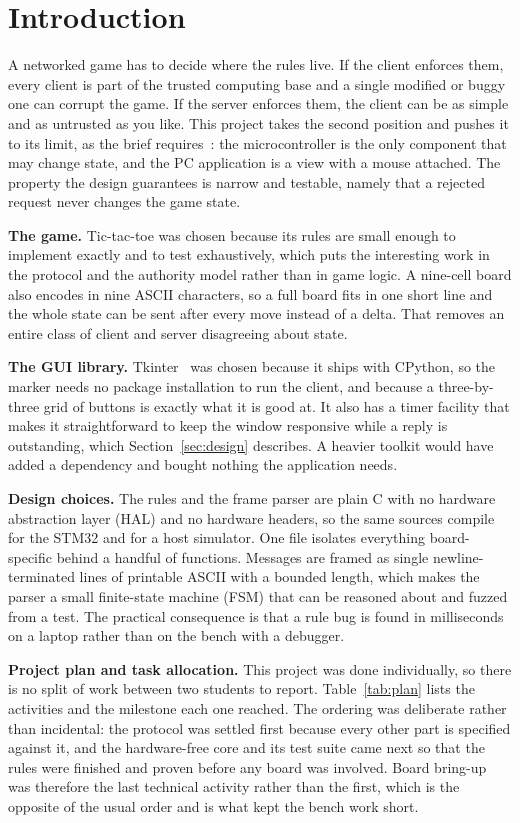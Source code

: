 \section{Introduction}
\label{sec:intro}

A networked game has to decide where the rules live. If the client enforces
them, every client is part of the trusted computing base and a single modified
or buggy one can corrupt the game. If the server enforces them, the client can
be as simple and as untrusted as you like. This project takes the second
position and pushes it to its limit, as the brief requires~\cite{brief}: the
microcontroller is the only component that may change state, and the PC
application is a view with a mouse attached. The property the design guarantees
is narrow and testable, namely that a rejected request never changes the game
state.

\textbf{The game.} Tic-tac-toe was chosen because its rules are small enough to
implement exactly and to test exhaustively, which puts the interesting work in
the protocol and the authority model rather than in game logic. A nine-cell
board also encodes in nine ASCII characters, so a full board fits in one short
line and the whole state can be sent after every move instead of a delta. That
removes an entire class of client and server disagreeing about state.

\textbf{The GUI library.} Tkinter~\cite{tkinter} was chosen because it ships
with CPython, so the marker needs no package installation to run the client, and
because a three-by-three grid of buttons is exactly what it is good at. It also
has a timer facility that makes it straightforward to keep the window responsive
while a reply is outstanding, which Section~\ref{sec:design} describes. A
heavier toolkit would have added a dependency and bought nothing the application
needs.

\textbf{Design choices.} The rules and the frame parser are plain C with no
hardware abstraction layer (HAL) and no hardware headers, so the same sources
compile for the STM32 and for a host simulator. One file isolates everything
board-specific behind a handful of functions. Messages are framed as single
newline-terminated lines of printable ASCII with a bounded length, which makes
the parser a small finite-state machine (FSM) that can be reasoned about and
fuzzed from a test. The practical consequence is that a rule bug is found in
milliseconds on a laptop rather than on the bench with a debugger.

\textbf{Project plan and task allocation.} This project was done
individually, so there is no split of work between two students to report.
Table~\ref{tab:plan} lists the activities and the milestone each one reached.
The ordering was deliberate rather than incidental: the protocol was settled
first because every other part is specified against it, and the hardware-free
core and its test suite came next so that the rules were finished and proven
before any board was involved. Board bring-up was therefore the last technical
activity rather than the first, which is the opposite of the usual order and is
what kept the bench work short.

